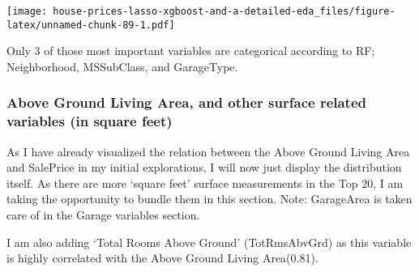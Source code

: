 \documentclass[]{article}
\begin{document}
\texttt{[image: house-prices-lasso-xgboost-and-a-detailed-eda\_files/figure-latex/unnamed-chunk-89-1.pdf]}

Only 3 of those most important variables are categorical according to
RF; Neighborhood, MSSubClass, and GarageType.

\hypertarget{above-ground-living-area-and-other-surface-related-variables-in-square-feet}{%
\subsubsection{Above Ground Living Area, and other surface related
variables (in square
feet)}\label{above-ground-living-area-and-other-surface-related-variables-in-square-feet}}

As I have already visualized the relation between the Above Ground
Living Area and SalePrice in my initial explorations, I will now just
display the distribution itself. As there are more `square feet' surface
measurements in the Top 20, I am taking the opportunity to bundle them
in this section. Note: GarageArea is taken care of in the Garage
variables section.

I am also adding `Total Rooms Above Ground' (TotRmsAbvGrd) as this
variable is highly correlated with the Above Ground Living Area(0.81).
\end{document}
